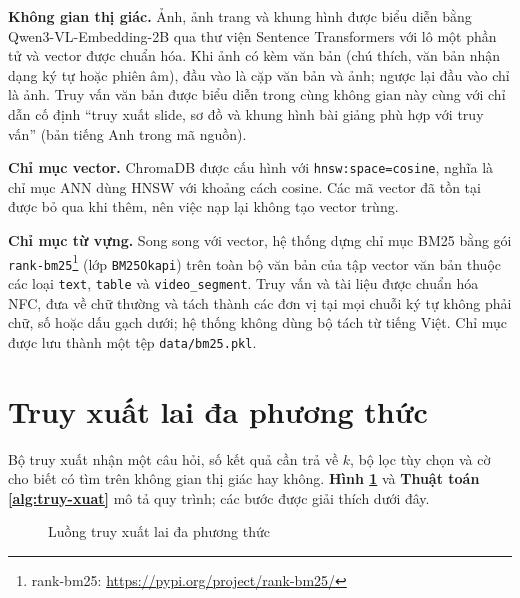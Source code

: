 \bigbreak\noindent
\textbf{Không gian thị giác.} Ảnh, ảnh trang và khung hình được biểu diễn bằng Qwen3-VL-Embedding-2B qua thư viện Sentence Transformers với lô một phần tử và vector được chuẩn hóa. Khi ảnh có kèm văn bản (chú thích, văn bản nhận dạng ký tự hoặc phiên âm), đầu vào là cặp văn bản và ảnh; ngược lại đầu vào chỉ là ảnh. Truy vấn văn bản được biểu diễn trong cùng không gian này cùng với chỉ dẫn cố định ``truy xuất slide, sơ đồ và khung hình bài giảng phù hợp với truy vấn'' (bản tiếng Anh trong mã nguồn).

\bigbreak\noindent
\textbf{Chỉ mục vector.} ChromaDB được cấu hình với \texttt{hnsw:space=cosine}, nghĩa là chỉ mục ANN dùng HNSW \cite{malkov2020hnsw} với khoảng cách cosine. Các mã vector đã tồn tại được bỏ qua khi thêm, nên việc nạp lại không tạo vector trùng.

\bigbreak\noindent
\textbf{Chỉ mục từ vựng.} Song song với vector, hệ thống dựng chỉ mục BM25 bằng gói \texttt{rank-bm25}\footnote{rank-bm25: \url{https://pypi.org/project/rank-bm25/}} (lớp \texttt{BM25Okapi}) trên toàn bộ văn bản của tập vector văn bản thuộc các loại \texttt{text}, \texttt{table} và \texttt{video\_segment}. Truy vấn và tài liệu được chuẩn hóa NFC, đưa về chữ thường và tách thành các đơn vị tại mọi chuỗi ký tự không phải chữ, số hoặc dấu gạch dưới; hệ thống không dùng bộ tách từ tiếng Việt. Chỉ mục được lưu thành một tệp \texttt{data/bm25.pkl}.


\section{Truy xuất lai đa phương thức}\label{sec:truy-xuat}

Bộ truy xuất nhận một câu hỏi, số kết quả cần trả về $k$, bộ lọc tùy chọn và cờ cho biết có tìm trên không gian thị giác hay không. \textbf{Hình \ref{fig:truy-xuat}} và \textbf{Thuật toán \ref{alg:truy-xuat}} mô tả quy trình; các bước được giải thích dưới đây.

\begin{figure}[ht]
    \centering
    
    \caption{Luồng truy xuất lai đa phương thức}
    \label{fig:truy-xuat}
\end{figure}

